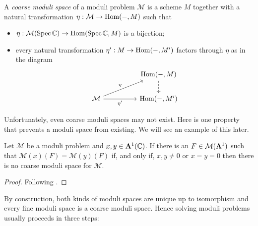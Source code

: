 \documentclass[12pt]{ociamthesis}  %
\begin{document}
\begin{definition}\missingcitation
  A \emph{coarse moduli space} of a moduli problem $\mathcal M$
  is a scheme $M$ together with a natural transformation
  $\eta : \mathcal M \to \operatorname{Hom}(-,M)$ such that
  \begin{itemize}
    \item $\eta : \mathcal M(\operatorname{Spec}\mathbb{C})\to \operatorname{Hom}(\operatorname{Spec}\mathbb{C},M)$ is a bijection;
    \item every natural transformation $\eta' : M \to \operatorname{Hom}(-,M')$ factors through
          $\eta$ as in the diagram
          \begin{equation*}
            \begin{tikzcd}
              && {\text{Hom}(-,M)} \\
              {\mathcal M} && {\text{Hom}(-,M')}
              \arrow[dashed, from=1-3, to=2-3]
              \arrow["\eta", from=2-1, to=1-3]
              \arrow["{\eta'}"', from=2-1, to=2-3]
            \end{tikzcd}
          \end{equation*}
  \end{itemize}
\end{definition}

\begin{example}
  \missingexample
\end{example}

Unfortunately, even coarse moduli spaces may not exist. Here is
one property that prevents a moduli space from existing. We will
see an example of this later. 

\begin{lemma}\label{lem:no_coarse_condition}
  Let $\mathcal M$ be a moduli problem and
  $x,y\in \mathbf{A}^{1}_{}(\mathbb{C})$. If there is an
  $F\in\mathcal M(\mathbf{A}^{1}_{})$ such that
  $\mathcal M(x)(F) = \mathcal M(y)(F)$ if, and only if,
  $x,y\neq 0$ or $x=y=0$ then there is no coarse moduli space
  for $\mathcal M$.
  \begin{proof}
    Following \cite[Lemma 2.27]{hoskins2016}.
    \missingproof
  \end{proof}
\end{lemma}

By construction, both kinds of moduli spaces are unique up to
isomorphism and every fine moduli space is a coarse moduli
space. Hence solving moduli problems usually proceeds in
three steps:
\end{document}
